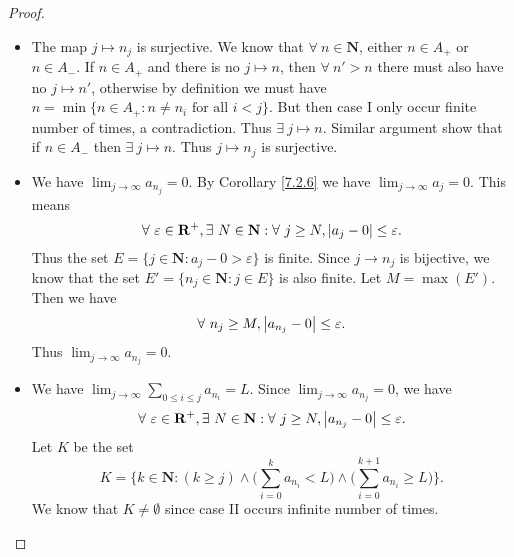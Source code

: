 \begin{proof}
\begin{itemize}
              Since all \(i > j\) are cases II, \(\sum_{i > j} a_{n_i}\) is decreasing.
              Since \(\sum_{i > j} a_{n_i}\) is decreasing and has lower bound, by Additional Corollary \ref{ac 6.3.1} \(\sum_{i > j} a_{n_i}\) is convergent.
              But this means \(\sum_{n \in A_-} a_n\) is absolutely convergent, a contradiction.
              Thus case I occurs infinite number of times.
              Similar proof show that case II also occurs infinite number of times.
        \item The map \(j \mapsto n_j\) is surjective.
              We know that \(\forall\ n \in \mathbf{N}\), either \(n \in A_+\) or \(n \in A_-\).
              If \(n \in A_+\) and there is no \(j \mapsto n\), then \(\forall\ n' > n\) there must also have no \(j \mapsto n'\), otherwise by definition we must have \(n = \min\{n \in A_+ : n \neq n_i \text{ for all } i < j\}\).
              But then case I only occur finite number of times, a contradiction.
              Thus \(\exists\ j \mapsto n\).
              Similar argument show that if \(n \in A_-\) then \(\exists\ j \mapsto n\).
              Thus \(j \mapsto n_j\) is surjective.
        \item We have \(\lim_{j \to \infty} a_{n_j} = 0\).
              By Corollary \ref{7.2.6} we have \(\lim_{j \to \infty} a_j = 0\).
              This means
              \[
                  \forall\ \varepsilon \in \mathbf{R}^+, \exists\ N \in \mathbf{N} : \forall\ j \geq N, \abs*{a_j - 0} \leq \varepsilon.
              \]
              Thus the set \(E = \{j \in \mathbf{N} : a_j - 0 > \varepsilon\}\) is finite.
              Since \(j \to n_j\) is bijective, we know that the set \(E' = \{n_j \in \mathbf{N} : j \in E\}\) is also finite.
              Let \(M = \max(E')\).
              Then we have
              \[
                  \forall\ n_j \geq M, \abs*{a_{n_j} - 0} \leq \varepsilon.
              \]
              Thus \(\lim_{j \to \infty} a_{n_j} = 0\).
        \item We have \(\lim_{j \to \infty} \sum_{0 \leq i \leq j} a_{n_i} = L\).
              Since \(\lim_{j \to \infty} a_{n_j} = 0\), we have
              \[
                  \forall\ \varepsilon \in \mathbf{R}^+, \exists\ N \in \mathbf{N} : \forall\ j \geq N, \abs*{a_{n_j} - 0} \leq \varepsilon.
              \]
              Let \(K\) be the set
              \[
                  K = \Bigg\{k \in \mathbf{N} : (k \geq j) \land \Bigg(\sum_{i = 0}^k a_{n_i} < L\Bigg) \land \Bigg(\sum_{i = 0}^{k + 1} a_{n_i} \geq L\Bigg)\Bigg\}.
              \]
              We know that \(K \neq \emptyset\) since case II occurs infinite number of times.

\end{itemize}
\end{proof}

